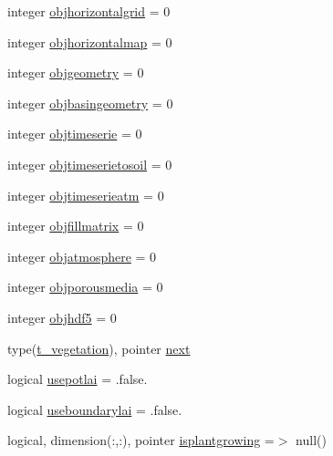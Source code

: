 \begin{DoxyCompactItemize}
\item 
integer \mbox{\hyperlink{structmodulevegetation_1_1t__vegetation_a4bed455a15e3a37c2047d021d04ebf64}{objhorizontalgrid}} = 0
\item 
integer \mbox{\hyperlink{structmodulevegetation_1_1t__vegetation_ace08638df40aaf2ad3bed76cf1b95680}{objhorizontalmap}} = 0
\item 
integer \mbox{\hyperlink{structmodulevegetation_1_1t__vegetation_a895698c8933d3a494e413c69458d3cd2}{objgeometry}} = 0
\item 
integer \mbox{\hyperlink{structmodulevegetation_1_1t__vegetation_a95d7f4e35a64ced153f4a3f7ffceccd0}{objbasingeometry}} = 0
\item 
integer \mbox{\hyperlink{structmodulevegetation_1_1t__vegetation_a7439e44ec4ae63aace2311ab4e9b734c}{objtimeserie}} = 0
\item 
integer \mbox{\hyperlink{structmodulevegetation_1_1t__vegetation_af0f429595483a6a0653d0d24522e681c}{objtimeserietosoil}} = 0
\item 
integer \mbox{\hyperlink{structmodulevegetation_1_1t__vegetation_a6c3da1df1707ba2e7701177fb0d22897}{objtimeserieatm}} = 0
\item 
integer \mbox{\hyperlink{structmodulevegetation_1_1t__vegetation_a15b269c49bb7a75c2b7bf1d3b202813a}{objfillmatrix}} = 0
\item 
integer \mbox{\hyperlink{structmodulevegetation_1_1t__vegetation_ab2ab19163bbe884499ef88f43b9c2450}{objatmosphere}} = 0
\item 
integer \mbox{\hyperlink{structmodulevegetation_1_1t__vegetation_a56f1a8de3cd7538c2e3c96087109ca8d}{objporousmedia}} = 0
\item 
integer \mbox{\hyperlink{structmodulevegetation_1_1t__vegetation_a107ed4fb779a5d22db11db05f3d04c52}{objhdf5}} = 0
\item 
type(\mbox{\hyperlink{structmodulevegetation_1_1t__vegetation}{t\+\_\+vegetation}}), pointer \mbox{\hyperlink{structmodulevegetation_1_1t__vegetation_ac61362de02a460bcc36f4a725e812bc9}{next}}
\item 
logical \mbox{\hyperlink{structmodulevegetation_1_1t__vegetation_a1ae78fdf041520200aeb4dce4d88bb34}{usepotlai}} = .false.
\item 
logical \mbox{\hyperlink{structmodulevegetation_1_1t__vegetation_aa4af507e0d68c93bf1d8f921d48bcf65}{useboundarylai}} = .false.
\item 
logical, dimension(\+:,\+:), pointer \mbox{\hyperlink{structmodulevegetation_1_1t__vegetation_aec92f95eed8c208706019b2f68e98a22}{isplantgrowing}} =$>$ null()

\end{DoxyCompactItemize}
